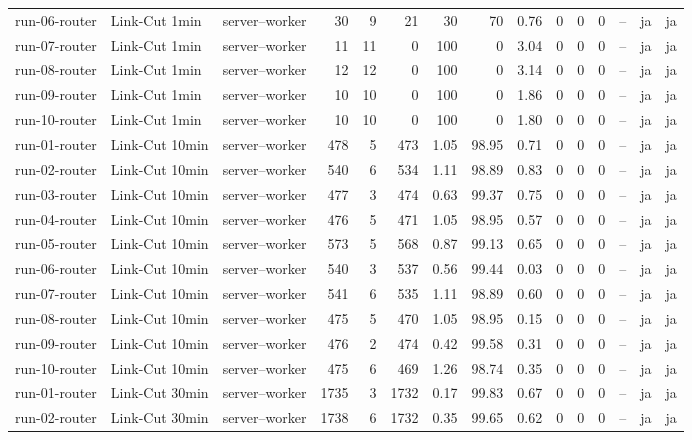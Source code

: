 \begin{table}
\begin{tabular}{l l p{3.2cm} r r r r r r r r r r r r}
run-06-router & Link-Cut 1min & server--worker & 30 & 9 & 21 & 30 & 70 & 0.76 & 0 & 0 & 0 & -- & ja & ja \\
run-07-router & Link-Cut 1min & server--worker & 11 & 11 & 0 & 100 & 0 & 3.04 & 0 & 0 & 0 & -- & ja & ja \\
run-08-router & Link-Cut 1min & server--worker & 12 & 12 & 0 & 100 & 0 & 3.14 & 0 & 0 & 0 & -- & ja & ja \\
run-09-router & Link-Cut 1min & server--worker & 10 & 10 & 0 & 100 & 0 & 1.86 & 0 & 0 & 0 & -- & ja & ja \\
run-10-router & Link-Cut 1min & server--worker & 10 & 10 & 0 & 100 & 0 & 1.80 & 0 & 0 & 0 & -- & ja & ja \\
run-01-router & Link-Cut 10min & server--worker & 478 & 5 & 473 & 1.05 & 98.95 & 0.71 & 0 & 0 & 0 & -- & ja & ja \\
run-02-router & Link-Cut 10min & server--worker & 540 & 6 & 534 & 1.11 & 98.89 & 0.83 & 0 & 0 & 0 & -- & ja & ja \\
run-03-router & Link-Cut 10min & server--worker & 477 & 3 & 474 & 0.63 & 99.37 & 0.75 & 0 & 0 & 0 & -- & ja & ja \\
run-04-router & Link-Cut 10min & server--worker & 476 & 5 & 471 & 1.05 & 98.95 & 0.57 & 0 & 0 & 0 & -- & ja & ja \\
run-05-router & Link-Cut 10min & server--worker & 573 & 5 & 568 & 0.87 & 99.13 & 0.65 & 0 & 0 & 0 & -- & ja & ja \\
run-06-router & Link-Cut 10min & server--worker & 540 & 3 & 537 & 0.56 & 99.44 & 0.03 & 0 & 0 & 0 & -- & ja & ja \\
run-07-router & Link-Cut 10min & server--worker & 541 & 6 & 535 & 1.11 & 98.89 & 0.60 & 0 & 0 & 0 & -- & ja & ja \\
run-08-router & Link-Cut 10min & server--worker & 475 & 5 & 470 & 1.05 & 98.95 & 0.15 & 0 & 0 & 0 & -- & ja & ja \\
run-09-router & Link-Cut 10min & server--worker & 476 & 2 & 474 & 0.42 & 99.58 & 0.31 & 0 & 0 & 0 & -- & ja & ja \\
run-10-router & Link-Cut 10min & server--worker & 475 & 6 & 469 & 1.26 & 98.74 & 0.35 & 0 & 0 & 0 & -- & ja & ja \\
run-01-router & Link-Cut 30min & server--worker & 1735 & 3 & 1732 & 0.17 & 99.83 & 0.67 & 0 & 0 & 0 & -- & ja & ja \\
run-02-router & Link-Cut 30min & server--worker & 1738 & 6 & 1732 & 0.35 & 99.65 & 0.62 & 0 & 0 & 0 & -- & ja & ja \\

\end{tabular}
\end{table}
